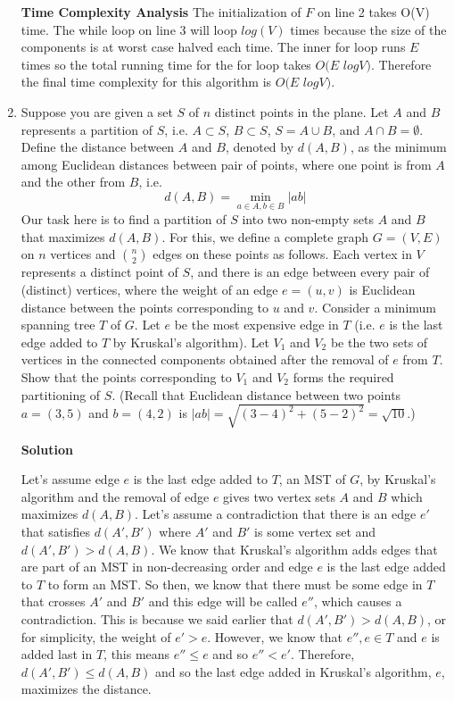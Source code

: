 \documentclass[12pt]{article}
\begin{document}
\begin{enumerate}
\textbf{Time Complexity Analysis}
The initialization of $F$ on line 2 takes O(V) time. The while loop on line 3 will loop $log(V)$ times because the size of the components is at worst case halved each time. The inner for loop  runs $E$ times so the total running time for the for loop takes $O(E$ $logV)$. Therefore the final time complexity for this algorithm is $O(E$ $logV)$.
\item \color{blue} Suppose you are given a set $S$ of $n$ distinct points in the plane.   Let $A$ and $B$ represents a partition of $S$, i.e. $A\subset S$, $B\subset S$, $S=A\cup B$, and $A\cap B=\emptyset$. Define the distance between $A$ and $B$, denoted by  $d(A,B)$, as the minimum among Euclidean distances between pair of points, where one point is from  $A$ and the other from $B$, i.e. 
$$d(A,B)=\min_{a\in A, b\in B}|ab|$$  
Our task here is to find a partition of $S$ into two non-empty sets $A$ and $B$ that maximizes $d(A,B)$. For this, we define a complete graph $G=(V,E)$ on $n$ vertices and ${n\choose 2}$ edges on these points as follows. Each vertex in $V$ represents a distinct point of $S$, and there is an edge between every pair of (distinct) vertices, where the weight of an edge 
$e=(u,v)$ is Euclidean distance between the points corresponding to $u$ and $v$. Consider a minimum spanning tree $T$ of $G$. Let $e$ be the most expensive edge in $T$ (i.e. $e$ is the last edge added to $T$ by Kruskal's algorithm). Let $V_1$ and $V_2$ be the two sets of vertices in the connected components obtained after the removal of $e$ from $T$. Show that the points  corresponding to $V_1$ and $V_2$ forms the required partitioning of $S$.       (Recall that Euclidean distance between  two points  $a=(3,5)$ and $b=(4,2)$ is $|ab|=\sqrt{(3-4)^2+(5-2)^2}= \sqrt{10}$.) 

\color{black}
\textbf{Solution} 

Let's assume edge $e$ is the last edge added to $T$, an MST of $G$, by Kruskal's algorithm and the removal of edge $e$ gives two vertex sets $A$ and $B$ which maximizes $d(A,B)$. Let's assume a contradiction that there is an edge $e'$ that satisfies $d(A',B')$ where $A'$ and $B'$ is some vertex set and $d(A',B') > d(A,B)$. We know that Kruskal's algorithm adds edges that are part of an MST in non-decreasing order and edge $e$ is the last edge added to $T$ to form an MST. So then, we know that there must be some edge in $T$ that crosses $A'$ and $B'$ and this edge will be called $e''$, which causes a contradiction. This is because we said earlier that $d(A',B') > d(A,B)$, or for simplicity, the weight of $e' > e$. However, we know that $e'', e \in T$ and $e$ is added last in $T$, this means $e''\leq e$ and so $e'' <e'$. Therefore, $d(A',B') \leq d(A,B)$ and so the last edge added in Kruskal's algorithm, $e$, maximizes the distance.


\end{enumerate}
\end{document}
